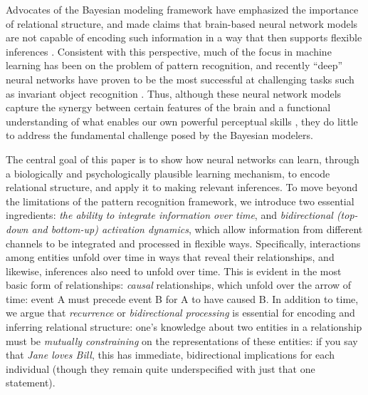 \documentclass[11pt,twoside]{article}
\newif\myifpdf
\begin{document}
Advocates of the Bayesian modeling framework have emphasized the importance of relational structure, and made claims that brain-based neural network models are not capable of encoding such information in a way that then supports flexible inferences \cite{GriffithsChaterKempEtAl10}.  Consistent with this perspective, much of the focus in machine learning has been on the problem of pattern recognition, and recently ``deep'' neural networks have proven to be the most successful at challenging tasks such as invariant object recognition \cite{CiresanMeierGambardellaEtAl10,CiresanMeierSchmidhuber12,KrizhevskySutskeverHinton12,BengioCourvilleVincent13}.  Thus, although these neural network models capture the synergy between certain features of the brain and a functional understanding of what enables our own powerful perceptual skills \cite{RiesenhuberPoggio02,OReillyWyatteHerdEtAl13}, they do little to address the fundamental challenge posed by the Bayesian modelers.  

The central goal of this paper is to show how neural networks can learn, through a biologically and psychologically plausible learning mechanism, to encode relational structure, and apply it to making relevant inferences.  To move beyond the limitations of the pattern recognition framework, we introduce two essential ingredients: {\em the ability to integrate information over time}, and {\em bidirectional (top-down and bottom-up) activation dynamics}, which allow information from different channels to be integrated and processed in flexible ways.  Specifically, interactions among entities unfold over time in ways that reveal their relationships, and likewise, inferences also need to unfold over time.  This is evident in the most basic form of relationships: {\em causal} relationships, which unfold over the arrow of time: event A must precede event B for A to have caused B.  In addition to time, we argue that {\em recurrence} or {\em bidirectional processing} is essential for encoding and inferring relational structure: one's knowledge about two entities in a relationship must be {\em mutually constraining} on the representations of these entities: if you say that {\em Jane loves Bill}, this has immediate, bidirectional implications for each individual (though they remain quite underspecified with just that one statement).
\end{document}

